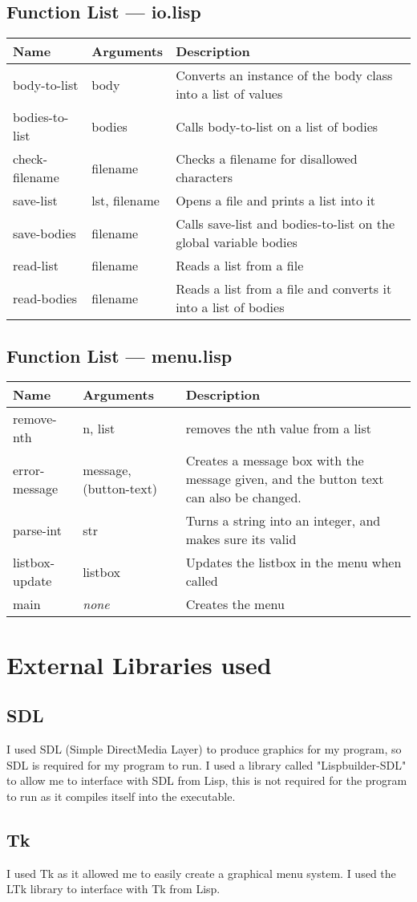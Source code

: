 \subsection{Function List --- io.lisp}
\begin{tabular}{p{}p{}p{}}
	Name & Arguments & Description\\ \hline
	body-to-list & body & Converts an instance of the body class into a list
	of values \\ 
	bodies-to-list & bodies & Calls body-to-list on a list of bodies \\
	check-filename & filename & Checks a filename for disallowed characters
	\\
	save-list & lst, filename & Opens a file and prints a list into it \\
	save-bodies & filename & Calls save-list and bodies-to-list on the
	global variable bodies \\
	read-list & filename & Reads a list from a file \\
	read-bodies & filename & Reads a list from a file and converts it into a
	list of bodies \\ 
\end{tabular}

\subsection{Function List --- menu.lisp}
\begin{tabular}{p{}p{}p{}}
	Name & Arguments & Description\\ \hline
	remove-nth & n, list & removes the nth value from a list \\
	error-message & message, (button-text) & Creates a message box with the
	message given, and the button text can also be changed. \\
	parse-int & str & Turns a string into an integer, and makes sure its
	valid \\
	listbox-update & listbox & Updates the listbox in the menu when called
	\\
	main & \emph{none}  & Creates the menu \\
\end{tabular}

\section{External Libraries used}
\subsection{SDL}
I used SDL (Simple DirectMedia Layer) to produce graphics for my program, so SDL
is required for my program to run. I used a library called "Lispbuilder-SDL" to
allow me to interface with SDL from Lisp, this is not required for the program
to run as it compiles itself into the executable.

\subsection{Tk}
I used Tk as it allowed me to easily create a graphical menu system. I used the
LTk library to interface with Tk from Lisp.

